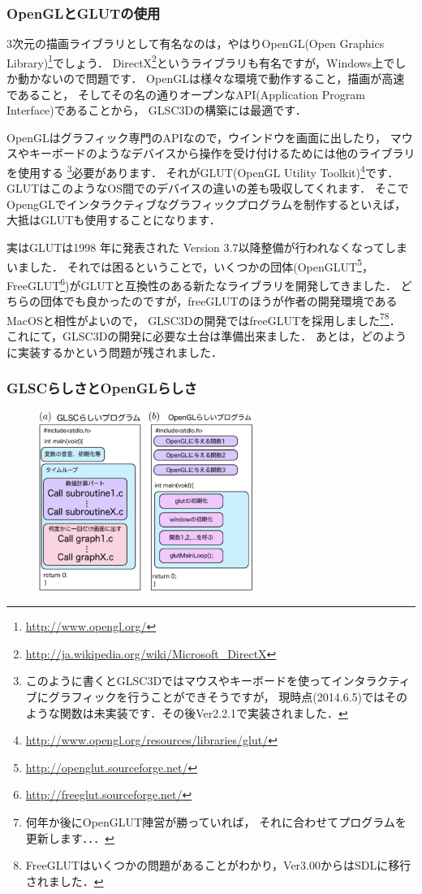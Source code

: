\documentclass[platex,a4paper,12pt]{jsarticle}%
\begin{document}
\subsubsection{OpenGLとGLUTの使用}
3次元の描画ライブラリとして有名なのは，やはりOpenGL(Open Graphics Library)\footnote{\url{http://www.opengl.org/}}でしょう．
DirectX\footnote{\url{http://ja.wikipedia.org/wiki/Microsoft_DirectX}}というライブラリも有名ですが，Windows上でしか動かないので問題です．
OpenGLは様々な環境で動作すること，描画が高速であること，
そしてその名の通りオープンなAPI(Application Program Interface)であることから，
GLSC3Dの構築には最適です．

OpenGLはグラフィック専門のAPIなので，ウインドウを画面に出したり，
マウスやキーボードのようなデバイスから操作を受け付けるためには他のライブラリを使用する
\footnote{このように書くとGLSC3Dではマウスやキーボードを使ってインタラクティブにグラフィックを行うことができそうですが，
現時点(2014.6.5)ではそのような関数は未実装です．その後Ver2.2.1で実装されました．}必要があります．
それがGLUT(OpenGL Utility Toolkit)\footnote{\url{http://www.opengl.org/resources/libraries/glut/}}です．
GLUTはこのようなOS間でのデバイスの違いの差も吸収してくれます．
そこでOpengGLでインタラクティブなグラフィックプログラムを制作するといえば，大抵はGLUTも使用することになります．

実はGLUTは1998 年に発表された Version 3.7以降整備が行われなくなってしまいました．
それでは困るということで，いくつかの団体(OpenGLUT\footnote{\url{http://openglut.sourceforge.net/}}，
FreeGLUT\footnote{\url{http://freeglut.sourceforge.net/}})がGLUTと互換性のある新たなライブラリを開発してきました．
どちらの団体でも良かったのですが，freeGLUTのほうが作者の開発環境であるMacOSと相性がよいので，
GLSC3Dの開発ではfreeGLUTを採用しました\footnote{何年か後にOpenGLUT陣営が勝っていれば，
それに合わせてプログラムを更新します．．．}\footnote{FreeGLUTはいくつかの問題があることがわかり，Ver3.00からはSDLに移行されました．}．
これにて，GLSC3Dの開発に必要な土台は準備出来ました．
あとは，どのように実装するかという問題が残されました．

\subsubsection{GLSCらしさとOpenGLらしさ}

\begin{figure}
\vspace{-1\baselineskip}
	\includegraphics[width=70mm]{002.eps}
\end{figure}
\end{document}
